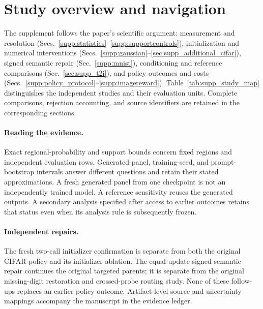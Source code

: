 \section*{Study overview and navigation}
The supplement follows the paper's scientific argument: measurement and
resolution (Secs.~\ref{supp:statistics}--\ref{supp:supportcontrols}),
initialization and numerical interventions
(Secs.~\ref{supp:gaussian}--\ref{sec:supp_additional_cifar}), signed semantic
repair (Sec.~\ref{supp:mnist}), conditioning and reference comparisons
(Sec.~\ref{sec:supp_t2i}), and policy outcomes and costs
(Secs.~\ref{supp:policy_protocol}--\ref{supp:imagereward}).
Table~\ref{tab:supp_study_map} distinguishes the independent studies and their
evaluation units. Complete comparisons, rejection accounting, and source
identifiers are retained in the corresponding sections.

\paragraph{Reading the evidence.}
Exact regional-probability and support bounds concern fixed regions and
independent evaluation rows. Generated-panel, training-seed, and
prompt-bootstrap intervals answer different questions and retain their stated
approximations. A fresh generated panel from one checkpoint is not an
independently trained model. A reference sensitivity reuses the generated
outputs. A secondary analysis specified after access to earlier outcomes
retains that status even when its analysis rule is subsequently frozen.

\paragraph{Independent repairs.}
The fresh two-call initializer confirmation is separate from both the original
CIFAR policy and its initializer ablation. The equal-update signed semantic
repair continues the original targeted parents; it is separate from the
original missing-digit restoration and crossed-probe routing study. None of
these follow-ups replaces an earlier policy outcome. Artifact-level source
and uncertainty mappings accompany the manuscript in the evidence ledger.

